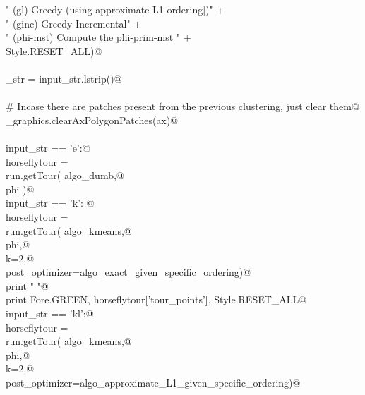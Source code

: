 \documentclass[11.5pt]{report}
\begin{document}
\begin{flushleft}
\begin{list}{}{}
\mbox{}\verb@        "  (gl)   Greedy (using approximate L1 ordering])\n"                 +\@\\
\mbox{}\verb@        "  (ginc) Greedy Incremental\n"                                      +\@\\
\mbox{}\verb@        "  (phi-mst) Compute the phi-prim-mst "                              +\@\\
\mbox{}\verb@        Style.RESET_ALL)@\\
\mbox{}\verb@@\\
\mbox{}\verb@input_str = input_str.lstrip()@\\
\mbox{}\verb@@\\
\mbox{}\verb@# Incase there are patches present from the previous clustering, just clear them@\\
\mbox{}\verb@utils_graphics.clearAxPolygonPatches(ax)@\\
\mbox{}\verb@@\\
\mbox{}\verb@if   input_str == 'e':@\\
\mbox{}\verb@      horseflytour = \@\\
\mbox{}\verb@             run.getTour( algo_dumb,@\\
\mbox{}\verb@                          phi )@\\
\mbox{}\verb@elif input_str == 'k': @\\
\mbox{}\verb@      horseflytour = \@\\
\mbox{}\verb@             run.getTour( algo_kmeans,@\\
\mbox{}\verb@                          phi,@\\
\mbox{}\verb@                          k=2,@\\
\mbox{}\verb@                          post_optimizer=algo_exact_given_specific_ordering)@\\
\mbox{}\verb@      print " "@\\
\mbox{}\verb@      print Fore.GREEN, horseflytour['tour_points'], Style.RESET_ALL@\\
\mbox{}\verb@elif input_str == 'kl':@\\
\mbox{}\verb@      horseflytour = \@\\
\mbox{}\verb@             run.getTour( algo_kmeans,@\\
\mbox{}\verb@                          phi,@\\
\mbox{}\verb@                          k=2,@\\
\mbox{}\verb@                          post_optimizer=algo_approximate_L1_given_specific_ordering)@\\

\end{list}
\end{flushleft}
\end{document}
